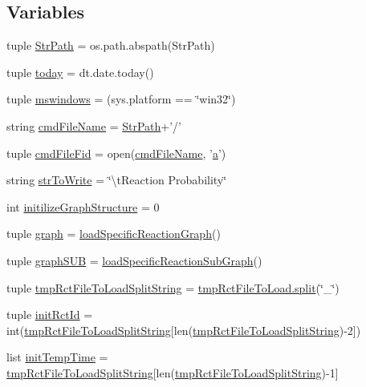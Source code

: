 \subsection*{Variables}
\begin{DoxyCompactItemize}
\item 
tuple \hyperlink{a00096_af8add8b37a9c8a7825c0e8f0e7dfd6c1}{Str\-Path} = os.\-path.\-abspath(Str\-Path)
\item 
tuple \hyperlink{a00096_a5498b0a6851ae4d3b2c3035093564e47}{today} = dt.\-date.\-today()
\item 
tuple \hyperlink{a00096_a2abf09620dd1dd990036c67c626b3dee}{mswindows} = (sys.\-platform == \char`\"{}win32\char`\"{})
\item 
string \hyperlink{a00096_a32551f85ad3cd8080b8ad81828276368}{cmd\-File\-Name} = \hyperlink{a00096_af8add8b37a9c8a7825c0e8f0e7dfd6c1}{Str\-Path}+'/'
\item 
tuple \hyperlink{a00096_a0a501feb02e67bd6a8ba75490709cf89}{cmd\-File\-Fid} = open(\hyperlink{a00096_a32551f85ad3cd8080b8ad81828276368}{cmd\-File\-Name}, '\hyperlink{a00029_a2ffdbad9ea59541e59cbd2b938e0770c}{a}')
\item 
string \hyperlink{a00096_a1966f0657c6b477eeb60bde732a201cc}{str\-To\-Write} = \char`\"{}\textbackslash{}t\-Reaction Probability\char`\"{}
\item 
int \hyperlink{a00096_ac6ad18bfc83e8ea3254897d46f990855}{initilize\-Graph\-Structure} = 0
\item 
tuple \hyperlink{a00096_ab45392da38059bf7557c22cbc73e5580}{graph} = \hyperlink{a00096_a7517a12f1c90a0ae0e997161079676bd}{load\-Specific\-Reaction\-Graph}()
\item 
tuple \hyperlink{a00096_ae307841da4a073fad4f6eaa172b0b970}{graph\-S\-U\-B} = \hyperlink{a00096_ab9d3c9c8514469b4dea42d8caacb3937}{load\-Specific\-Reaction\-Sub\-Graph}()
\item 
tuple \hyperlink{a00096_add910e17b3f1fe61cdbaf8ce60ec0e20}{tmp\-Rct\-File\-To\-Load\-Split\-String} = \hyperlink{a00070_a4d1aa74fac80ae0275c056575fdb6626}{tmp\-Rct\-File\-To\-Load.\-split}(\char`\"{}\-\_\-\char`\"{})
\item 
tuple \hyperlink{a00096_a212643643fc6b002e8797f16633bb16d}{init\-Rct\-Id} = int(\hyperlink{a00096_add910e17b3f1fe61cdbaf8ce60ec0e20}{tmp\-Rct\-File\-To\-Load\-Split\-String}\mbox{[}len(\hyperlink{a00096_add910e17b3f1fe61cdbaf8ce60ec0e20}{tmp\-Rct\-File\-To\-Load\-Split\-String})-\/2\mbox{]})
\item 
list \hyperlink{a00096_adc4403c4cfe080918c8b9da692c50509}{init\-Temp\-Time} = \hyperlink{a00096_add910e17b3f1fe61cdbaf8ce60ec0e20}{tmp\-Rct\-File\-To\-Load\-Split\-String}\mbox{[}len(\hyperlink{a00096_add910e17b3f1fe61cdbaf8ce60ec0e20}{tmp\-Rct\-File\-To\-Load\-Split\-String})-\/1\mbox{]}

\end{DoxyCompactItemize}
